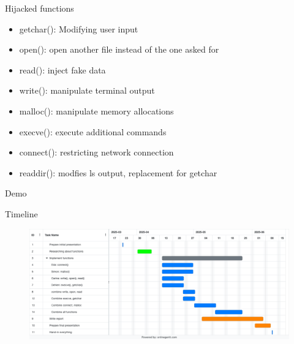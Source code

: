 \documentclass[aspectratio=169,xcolor=table]{beamer}
\begin{document}
\begin{frame}[c]{Hijacked functions}
\begin{itemize}
    \item getchar(): Modifying user input
    \item open(): open another file instead of the one asked for
    \item read(): inject fake data
    \item write(): manipulate terminal output
    \item malloc(): manipulate memory allocations
    \item execve(): execute additional commands 
    \item connect(): restricting network connection
    \item readdir(): modfies ls output,  replacement for getchar
\end{itemize}

\end{frame}

\begin{frame}[c]{Demo}

\end{frame}

\begin{frame}[c]{Timeline}
    \begin{figure}
        \includegraphics[width=1\textwidth]{images/Online Gantt 20250325.pdf}
        \hfill
    \end{figure}  
\end{frame}
\end{document}
